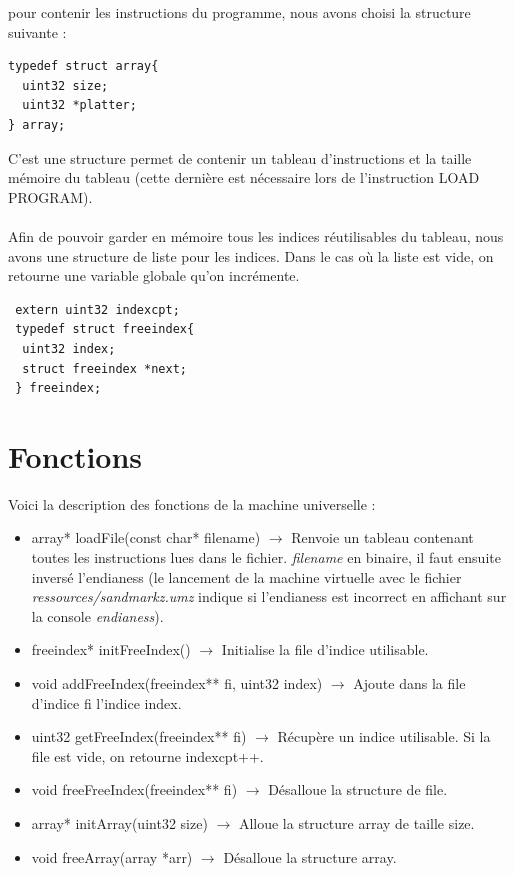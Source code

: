 \documentclass[a4paper,12pt]{report}
\begin{document}
pour contenir les instructions du programme, nous avons choisi la structure suivante :
\begin{verbatim}
typedef struct array{
  uint32 size;
  uint32 *platter;
} array;
\end{verbatim}
C'est une structure permet de contenir un tableau d'instructions et la taille mémoire du tableau (cette dernière est nécessaire lors de
l'instruction LOAD PROGRAM).
\\ \\
Afin de pouvoir garder en mémoire tous les indices réutilisables du tableau, nous avons une structure de liste pour les indices. Dans le cas où
la liste est vide, on retourne une variable globale qu'on incrémente.
\begin{verbatim}
 extern uint32 indexcpt;
 typedef struct freeindex{
  uint32 index;
  struct freeindex *next;
 } freeindex;
\end{verbatim}

\section{Fonctions}
Voici la description des fonctions de la machine universelle :
\begin{itemize}
 \item array* loadFile(const char* filename) $\rightarrow$ Renvoie un tableau contenant toutes les instructions lues dans le fichier.
 \textit{filename} en binaire, il faut ensuite inversé l'endianess (le lancement de la machine virtuelle avec le fichier
 \textit{ressources/sandmarkz.umz} indique si l'endianess est incorrect en affichant sur la console \textit{endianess}).
 \item freeindex* initFreeIndex() $\rightarrow$ Initialise la file d'indice utilisable.
 \item void addFreeIndex(freeindex** fi, uint32 index) $\rightarrow$ Ajoute dans la file d'indice fi l'indice index.
 \item uint32 getFreeIndex(freeindex** fi) $\rightarrow$ Récupère un indice utilisable. Si la file est vide, on retourne indexcpt++.
 \item void freeFreeIndex(freeindex** fi) $\rightarrow$ Désalloue la structure de file.
 \item array* initArray(uint32 size) $\rightarrow$ Alloue la structure array de taille size.
 \item void freeArray(array *arr) $\rightarrow$ Désalloue la structure array.
\end{itemize}
\end{document}
